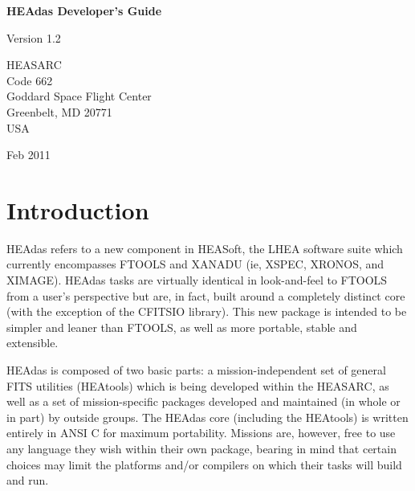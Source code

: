 \documentclass[11pt]{book}
\begin{document}
\begin{titlepage}
\normalsize
\vspace*{4.0cm}
\begin{center}
{\Huge \bf HEAdas Developer's Guide}\\
\end{center}
\medskip
\medskip
\begin{center}
{\Large Version 1.2 \\}
\end{center}
\bigskip
\vskip 2.5cm
\begin{center}
{HEASARC\\
Code 662\\
Goddard Space Flight Center\\
Greenbelt, MD 20771\\
USA}
\end{center}

\vfill
\bigskip
\begin{center}
{\Large Feb 2011\\}
\end{center}
\vfill
\end{titlepage}

\begin{titlepage}
\vspace*{7.6cm}
\vfill
\end{titlepage}


\tableofcontents
{}
\chapter{Introduction}
HEAdas refers to a new component in HEASoft, the LHEA software
suite which currently encompasses FTOOLS and XANADU (ie, XSPEC,
XRONOS, and XIMAGE). HEAdas tasks are virtually identical in
look-and-feel to FTOOLS from a user's perspective but are, in
fact, built around a completely distinct core (with the exception
of the CFITSIO library). This new package is intended to be simpler
and leaner than FTOOLS, as well as more portable, stable and extensible.

HEAdas is composed of two basic parts: a mission-independent
set of general FITS utilities (HEAtools) which is being developed
within the HEASARC, as well as a set of mission-specific
packages developed and maintained (in whole or in part) by
outside groups. The HEAdas core (including the HEAtools) is
written entirely in ANSI C for maximum portability. Missions are,
however, free to use any language they wish within their own
package, bearing in mind that certain choices may limit the
platforms and/or compilers on which their tasks will build and run.
\end{document}
